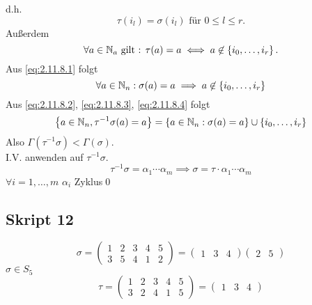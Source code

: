 \begin{subproof*}
\begin{description}
			d.h.
			\begin{equation}
				\label{eq:2.11.8.2}
				\tau(i_l) = \sigma(i_l) \text{ für } 0 \leq l \leq r.
			\end{equation}
			Außerdem
			\begin{equation}
				\label{eq:2.11.8.3}
				\forall a \in \N _a $ gilt : $ \tau(a) = a \iff a \not\in \left\{ i_0, \dotsc, i_r \right\}.
			\end{equation}
			Aus \eqref{eq:2.11.8.1} folgt 
			\begin{equation}
				\label{eq:2.11.8.4}
				\forall a \in \mathbb{N} _n: \sigma(a) = a \implies a \not\in \left\{ i_0, \dotsc, i_r \right\}
			\end{equation}
			Aus \eqref{eq:2.11.8.2}, \eqref{eq:2.11.8.3}, \eqref{eq:2.11.8.4} folgt
			\begin{equation}
				\label{eq:2.11.8.5}
				\left\{ a \in \mathbb{N} _n , \tau^{-1} \sigma(a) = a \right\} = \left\{ a \in \mathbb{N} _n : \sigma(a) = a \right\} \cup \left\{ i_0, \dotsc, i_r \right\} 
			\end{equation}
			Also $ \Gamma(\tau ^{-1} \sigma) < \Gamma(\sigma) $.\\
			I.V. anwenden auf $ \tau ^{-1} \sigma $.
			\[
				\tau ^{-1} \sigma = \alpha_1 \dotsb \alpha_m \implies \sigma = \tau \cdot \alpha_1 \dotsb \alpha_m
			\]
			$ \forall i = 1, \dotsc, m $ $ \alpha_i $ Zyklus\qed
			
	\end{description}
\end{subproof*}

\subsection{Skript 12}
\setcounter{subenvironmentnumber}{-1}
\begin{subexample}
	\[
		\sigma =
		\begin{pmatrix} 1 & 2 & 3 & 4 & 5 \\ 3 & 5 & 4 & 1 & 2 \end{pmatrix} 
		= \begin{pmatrix} 1 & 3 & 4 \end{pmatrix} \begin{pmatrix} 2 & 5 \end{pmatrix} 
	\]
	$ \sigma \in S_5 $ 
	\[
		\tau =
		\begin{pmatrix} 1 & 2 & 3 & 4 & 5 \\ 3 & 2 & 4 & 1 & 5 \end{pmatrix} 
		= \begin{pmatrix} 1 & 3 & 4 \end{pmatrix} 
	\]
\end{subexample}


